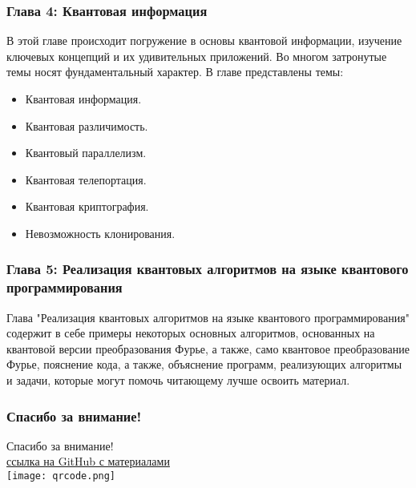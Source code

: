\documentclass{beamer}
\begin{document}
	\begin{frame}\frametitle{Глава 4: Квантовая информация}
		\justifying
		В этой главе происходит погружение в основы квантовой информации, изучение ключевых концепций и их удивительных приложений. Во многом затронутые темы носят фундаментальный характер. В главе представлены темы:
		\begin{itemize}
			\item \justifying Квантовая информация.
			\item \justifying Квантовая различимость.
			\item \justifying Квантовый параллелизм.
			\item \justifying Квантовая телепортация.
			\item \justifying Квантовая криптография.
			\item \justifying Невозможность клонирования.
		\end{itemize}
	\end{frame}
	
	
	\begin{frame}\frametitle{Глава 5: Реализация квантовых алгоритмов на языке квантового программирования }
		\justifying Глава "Реализация квантовых алгоритмов на языке квантового программирования"  содержит в себе примеры некоторых основных алгоритмов, основанных на квантовой версии преобразования Фурье, а также, само квантовое преобразование Фурье, пояснение кода, а также, объяснение программ, реализующих алгоритмы и задачи, которые могут помочь читающему лучше освоить материал.
	\end{frame}
	
	\begin{frame}
		\frametitle{Спасибо за внимание!}
		\begin{center}
			\Large Спасибо за внимание! \\
			\vspace{1cm}
			\href{https://github.com/Lanuis-1/Educational-and-methodical-manual.git}{ссылка на GitHub с материалами} \\
			\vspace{0.5cm}
			\texttt{[image: qrcode.png]}
		\end{center}
	\end{frame}
\end{document}
